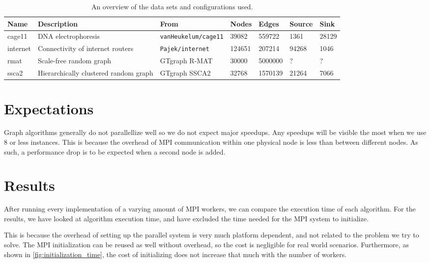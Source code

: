 \begin{table}
	\centering

	\begin{tabularx}{\textwidth}{l | X | l | l | l | l | l}
		Name & Description & From & Nodes & Edges & Source & Sink \\
		\hline
		cage11 & DNA electrophoresis & \texttt{vanHeukelum/cage11} & 39082 & 559722 & 1361 & 28129 \\
		internet & Connectivity of internet routers & \texttt{Pajek/internet} & 124651 & 207214 & 94268 & 1046 \\
		rmat & Scale-free random graph & GTgraph R-MAT & 30000 & 5000000 & ? & ? \\
		ssca2 & Hierarchically clustered random graph & GTgraph SSCA2 & 32768 & 1570139 & 21264 & 7066 \\
	\end{tabularx}
	\caption{An overview of the data sets and configurations used.}
	\label{tab:data-overview}
\end{table}


\section{Expectations}
Graph algorithms generally do not parallellize well %
so we do not expect major speedups. Any speedups will be visible the most when we use 8 or less instances. This is because the overhead of MPI communication within one physical node is less than between different nodes. As such, a performance drop is to be expected when a second node is added.

\section{Results}
After running every implementation of a varying amount of MPI workers, we can compare the execution time of each algorithm. For the results, we have looked at algorithm execution time, and have excluded the time needed for the MPI system to initialize.

This is because the overhead of setting up the parallel system is very much platform dependent, and not related to the problem we try to solve. The MPI initialization can be reused as well without overhead, so the cost is negligible for real world scenarios. Furthermore, as shown in \autoref{fig:initialization_time}, the cost of initializing does not increase that much with the number of workers.

